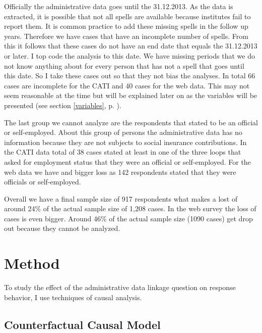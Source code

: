 

	Officially the administrative data goes until the 31.12.2013. As the data is extracted, it is possible that not all spells are available because institutes fail to report them. It is common practice to add these missing spells in the follow up years. Therefore we have cases that have an incomplete number of spells. From this it follows that these cases do not have an end date that equals the 31.12.2013 or later. I top code the analysis to this date. We have missing periods that we do not know anything about for every person that has not a spell that goes until this date. So I take these cases out so that they not bias the analyses. In total 66 cases are incomplete for the CATI and 40 cases for the web data. This may not seem reasonable at the time but will be explained later on as the variables will be presented (see section \ref{variables}, p. \pageref{variables}). 
	
	The last group we cannot analyze are the respondents that stated to be an official or self-employed. About this group of persons the administrative data has no information because they are not subjects to social insurance contributions. In the CATI data total of 38 cases stated at least in one of the three loops that asked for employment status that they were an official or self-employed. For the web data we have and bigger loss as 142 respondents stated that they were officials or self-employed.
	
	Overall we have a final sample size of 917 respondents what makes a lost of around 24\% of the actual sample size of 1,208 cases. In the web survey the loss of cases is even bigger. Around 46\% of the actual sample size (1090 cases) get drop out because they cannot be analyzed. 
	









\section{Method}\label{method}

To study the effect of the administrative data linkage question on response behavior, I use techniques of causal analysis. 

\subsection{Counterfactual Causal Model}	

